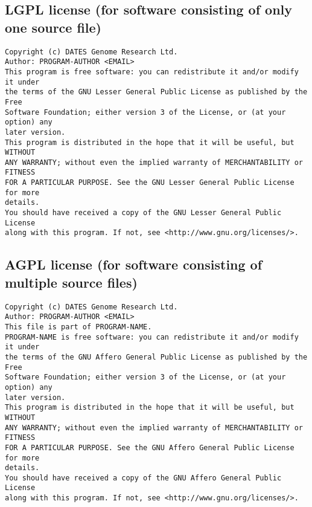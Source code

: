 \documentclass[10pt,a4paper]{article}
\begin{document}
\subsection{LGPL license (for software consisting of only one source file)}
\begin{boilerplate}
\begin{verbatim}
Copyright (c) DATES Genome Research Ltd. 
Author: PROGRAM-AUTHOR <EMAIL> 
This program is free software: you can redistribute it and/or modify it under 
the terms of the GNU Lesser General Public License as published by the Free 
Software Foundation; either version 3 of the License, or (at your option) any 
later version. 
This program is distributed in the hope that it will be useful, but WITHOUT 
ANY WARRANTY; without even the implied warranty of MERCHANTABILITY or FITNESS 
FOR A PARTICULAR PURPOSE. See the GNU Lesser General Public License for more 
details. 
You should have received a copy of the GNU Lesser General Public License 
along with this program. If not, see <http://www.gnu.org/licenses/>. 
\end{verbatim}
\end{boilerplate}

\subsection{AGPL license (for software consisting of multiple source files)}
\begin{boilerplate}
\begin{verbatim}
Copyright (c) DATES Genome Research Ltd. 
Author: PROGRAM-AUTHOR <EMAIL> 
This file is part of PROGRAM-NAME. 
PROGRAM-NAME is free software: you can redistribute it and/or modify it under 
the terms of the GNU Affero General Public License as published by the Free 
Software Foundation; either version 3 of the License, or (at your option) any 
later version. 
This program is distributed in the hope that it will be useful, but WITHOUT 
ANY WARRANTY; without even the implied warranty of MERCHANTABILITY or FITNESS 
FOR A PARTICULAR PURPOSE. See the GNU Affero General Public License for more 
details. 
You should have received a copy of the GNU Affero General Public License 
along with this program. If not, see <http://www.gnu.org/licenses/>.
\end{verbatim}
\end{boilerplate}
\end{document}
